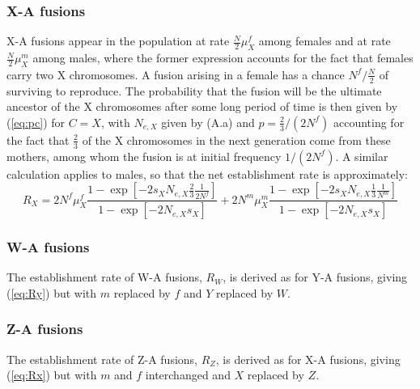 \subsubsection{X-A fusions}

X-A fusions appear in the population at rate $\frac{N}{\text{2}}\mu^f_X$ among females and at rate $\frac{N}{\text{2}}\mu^m_X$ among males, where the former expression accounts for the fact that females carry two X chromosomes. A fusion arising in a female has a chance $N^f/\frac{N}{\text{2}}$ of surviving to reproduce. The probability that the fusion will be the ultimate ancestor of the X chromosomes after some long period of time is then given by (\ref{eq:pc}) for $C = X$, with $N_{e,X}$ given by (A.a) and $p=\frac{\text{2}}{\text{3}}/(\text{2}N^f)$ accounting for the fact that $\frac{\text{2}}{\text{3}}$ of the X chromosomes in the next generation come from these mothers, among whom the fusion is at initial frequency $\text{1}/(\text{2}N^f)$. A similar calculation applies to males, so that the net establishment rate is approximately:
\begin{equation}\label{eq:Rx}
R_X = \text{2}N^f\mu^f_X 
\frac{\text{1}- \exp[-\text{2}s_X N_{e,X}  \frac{\text{2}}{\text{3}} \frac{\text{1}}{\text{2}N^f} ]}{\text{1} - \exp[-\text{2}N_{e,X} s_X]} 
+ \text{2}N^m\mu^m_X \frac{\text{1}- \exp[-\text{2}s_X N_{e,X}  \frac{\text{1}}{\text{3}} \frac{\text{1}}{N^m}]}{\text{1} - \exp[-\text{2}N_{e,X} s_X]}
\end{equation}

\subsubsection{W-A fusions}
The establishment rate of W-A fusions, $R_W$, is derived as for Y-A fusions, giving (\ref{eq:Ry}) but with $m$ replaced by $f$ and $Y$ replaced by $W$.

\subsubsection{Z-A fusions}
The establishment rate of Z-A fusions, $R_Z$, is derived as for X-A fusions, giving (\ref{eq:Rx}) but with $m$ and $f$ interchanged and $X$ replaced by $Z$.

